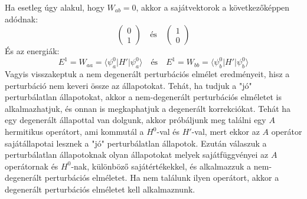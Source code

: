 \documentclass[../main.tex]{subfiles}
\begin{document}
Ha esetleg úgy alakul, hogy $W_{ab} = 0$, akkor a sajátvektorok a következőképpen adódnak:
\begin{equation}
    \begin{pmatrix}
        0 \\
        1
    \end{pmatrix} \quad \text{és} \quad
    \begin{pmatrix}
        1 \\
        0
    \end{pmatrix}
\end{equation}
És az energiák:
\begin{equation}
    E^1 = W_{aa} = \langle \psi_a^0 | H' | \psi_a^0 \rangle \quad \text{és} \quad E^1 = W_{bb} = \langle \psi_b^0 | H' | \psi_b^0 \rangle
\end{equation}
Vagyis visszakeptuk a nem degenerált perturbációs elmélet eredményeit, hisz a perturbáció nem keveri össze az állapotokat. Tehát, ha tudjuk a "jó" perturbálatlan állapotokat, akkor a nem-degenerált perturbációs elméletet is alkalmazhatjuk,
és onnan is megkaphatjuk a degenerált korrekciókat. Tehát ha egy degenerált állapottal van dolgunk, akkor próbáljunk meg találni egy $A$ hermitikus operátort, ami kommutál a $H^0$-val és $H'$-val, mert ekkor az $A$ operátor sajátállapotai lesznek a "jó" perturbálatlan állapotok.
Ezután válaszuk a perturbálatlan állapotoknak olyan állapotokat melyek sajátfüggvényei az $A$ operátornak és $H^0$-nak, különböző sajátértékekkel, és alkalmazzuk a nem-degenerált perturbációs elméletet. Ha nem találunk ilyen operátort, akkor a degenerált perturbációs elméletet kell alkalmaznunk.
\end{document}
